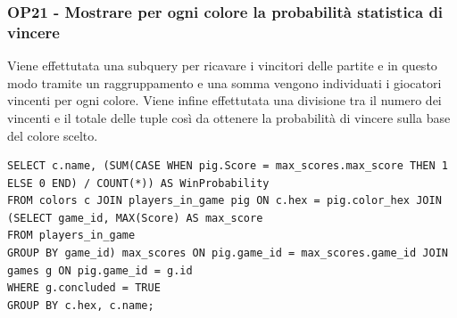 \subsubsection*{OP21 - Mostrare per ogni colore la probabilità statistica di vincere}
Viene effettutata una subquery per ricavare i vincitori delle partite e in questo modo tramite un raggruppamento e una somma vengono individuati i giocatori vincenti per ogni colore. Viene infine effettutata una divisione tra il numero dei vincenti e il totale delle tuple così da ottenere la probabilità di vincere sulla base del colore scelto.
\medskip

\begin{lstlisting}[style=sql]
SELECT c.name, (SUM(CASE WHEN pig.Score = max_scores.max_score THEN 1 ELSE 0 END) / COUNT(*)) AS WinProbability
FROM colors c JOIN players_in_game pig ON c.hex = pig.color_hex JOIN (SELECT game_id, MAX(Score) AS max_score
FROM players_in_game
GROUP BY game_id) max_scores ON pig.game_id = max_scores.game_id JOIN games g ON pig.game_id = g.id
WHERE g.concluded = TRUE
GROUP BY c.hex, c.name;
\end{lstlisting}
